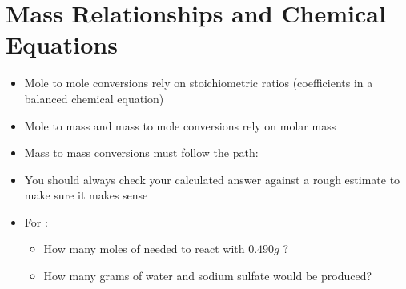 \documentclass[12pt, openany, letterpaper]{memoir}
\begin{document}
\section{Mass Relationships and Chemical Equations}
\begin{itemize}
	\item Mole to mole conversions rely on stoichiometric ratios (coefficients in a balanced chemical equation)
	\item Mole to mass and mass to mole conversions rely on molar mass
	\item Mass to mass conversions must follow the path: 
	\item You should always check your calculated answer against a rough estimate to make sure it makes sense
	\item For :
	\begin{itemize}
		\item How many  moles of  needed to react with $0.490g$ ?
		\item How many grams of water and sodium sulfate would be produced?
	\end{itemize}
\end{itemize}
\end{document}
